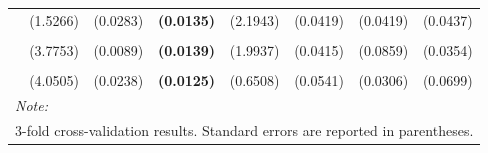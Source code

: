 \documentclass[
  12pt,
]{article}
\begin{document}
\begin{table}[H]
{\begin{tabular}[t]{lll>{}lllll}
 & (1.5266) & (0.0283) & \textbf{(0.0135)} & (2.1943) & (0.0419) & (0.0419) & (0.0437)\\
\addlinespace
\cellcolor{gray!6}{c.hp221k} & \cellcolor{gray!6}{-3.6880} & \cellcolor{gray!6}{0.4692} & \textbf{\cellcolor{gray!6}{0.4955}} & \cellcolor{gray!6}{-3.9673} & \cellcolor{gray!6}{0.7913} & \cellcolor{gray!6}{0.2306} & \cellcolor{gray!6}{0.6874}\\
 & (3.7753) & (0.0089) & \textbf{(0.0139)} & (1.9937) & (0.0415) & (0.0859) & (0.0354)\\
\addlinespace
\cellcolor{gray!6}{c.bn6.r20} & \cellcolor{gray!6}{-6.2230} & \cellcolor{gray!6}{0.5007} & \textbf{\cellcolor{gray!6}{0.4948}} & \cellcolor{gray!6}{-0.1197} & \cellcolor{gray!6}{0.6855} & \cellcolor{gray!6}{0.3028} & \cellcolor{gray!6}{0.5650}\\
 & (4.0505) & (0.0238) & \textbf{(0.0125)} & (0.6508) & (0.0541) & (0.0306) & (0.0699)\\
\bottomrule
\multicolumn{8}{l}{\rule{0pt}{1em}\textit{Note: }}\\
\multicolumn{8}{l}{\rule{0pt}{1em}3-fold cross-validation results. Standard errors are reported in parentheses.}\\
\end{tabular}}
\end{table}
\end{document}
